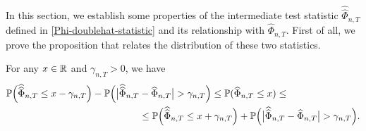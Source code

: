 \documentclass[a4paper,12pt]{article}
\newcommand{\doublehattwo}[1]{\widehat{\widehat{#1}}}
\begin{document}
In this section, we establish some properties of the intermediate test statistic $\doublehattwo{\Phi}_{n,T}$ defined in \eqref{Phi-doublehat-statistic} and its relationship with $\widehat{\Phi}_{n, T}$. First of all, we prove the proposition that relates the distribution of these two statistics.


\begin{propA}\label{propA-intermediate-relation}
For any $x \in \mathbb{R}$ and $\gamma_{n, T} > 0$, we have
\begin{align*} \pr\Big(\doublehattwo{\Phi}_{n,T} \le x - \gamma_{n, T}\Big) - \pr \Big(\big|\doublehattwo{\Phi}_{n,T} &- \widehat{\Phi}_{n,T}\big| > \gamma_{n, T} \Big)\le \pr(\widehat{\Phi}_{n, T} \le x) \le \\
&\le\pr\Big(\doublehattwo{\Phi}_{n,T} \le x + \gamma_{n, T}\Big) + \pr \Big(\big|\doublehattwo{\Phi}_{n,T} - \widehat{\Phi}_{n,T}\big| > \gamma_{n, T} \Big).
\end{align*}
\end{propA}
\end{document}

